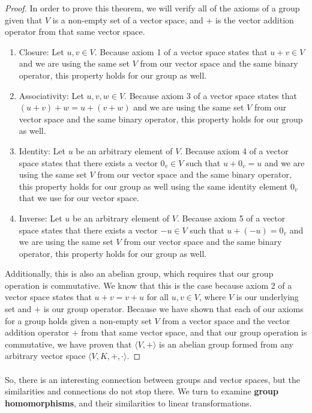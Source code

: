 \documentclass{article}
\newcommand{\done}{\renewcommand\qedsymbol{$\blacksquare$}}
\begin{document}
\begin{proof}
    In order to prove this theorem, we will verify all of the axioms of a group
    given that $V$ is a non-empty set of a vector space, and $+$ is the vector 
    addition operator from that same vector space. 
    \begin{enumerate}
      \item Closure: Let $u,v \in V$. Because axiom 1 of a vector space states that
      $u+v \in V$ and we are using the same set $V$ from our vector space and the 
      same binary operator, this property holds for our group as well.
      \item Associativity: Let $u,v,w \in V$. Because axiom 3 of a vector space states that
      $(u+v)+w = u+(v+w)$ and we are using the same set $V$ from our vector space and the
      same binary operator, this property holds for our group as well.
      \item Identity: Let $u$ be an arbitrary element of $V$. Because axiom 4 of a vector space states that
      there exists a vector $0_v \in V$ such that $u+0_v = u$ and we are using the same set $V$ from our vector space and the
      same binary operator, this property holds for our group as well using the 
      same identity element $0_v$ that we use for our vector space.
      \item Inverse: Let $u$ be an arbitrary element of $V$. Because axiom 5 of a vector space states that
      there exists a vector $-u \in V$ such that $u+(-u) = 0_v$ and we are using the same set $V$ from our vector space and the
      same binary operator, this property holds for our group as well.
    \end{enumerate}
Additionally, this is also an abelian group, which requires that our group operation 
is commutative. We know that this is the case because axiom 2 of a vector space states that
$u+v = v+u$ for all $u,v \in V$, where $V$ is our underlying set and $+$ is our group operator.
Because we have shown that each of our axioms for a group holds given a non-empty 
set $V$ from a vector space and the vector addition operator $+$ from that same
vector space, and that our group operation is commutative, we have proven that
$\langle V, + \rangle$ is an abelian group formed from any arbitrary vector space 
$\langle V, K, +, \cdot \rangle$.
\done  
\end{proof}

\paragraph*{} So, there is an interesting connection between groups and vector spaces,
but the similarities and connections do not stop there. We turn to examine 
\textbf{group homomorphisms}, and their similarities to linear transformations.
\end{document}
